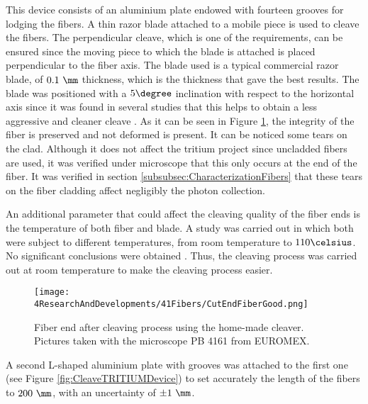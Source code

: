 This device consists of an aluminium plate endowed with fourteen grooves for lodging the fibers. A thin razor blade attached to a mobile piece is used to cleave the fibers. The perpendicular cleave, which is one of the requirements, can be ensured since the moving piece to which the blade is attached is placed perpendicular to the fiber axis. The blade used is a typical commercial razor blade, of $0.1~\mm$ thickness, which is the thickness that gave the best results. The blade was positioned with a $5\degree$ inclination with respect to the horizontal axis since it was found in several studies that this helps to obtain a less aggressive and cleaner cleave \cite{AngleBlade, TemperatureBlade}. As it can be seen in Figure \ref{fig:CleavingFiberEnd}, the integrity of the fiber is preserved and not deformed is present. It can be noticed some tears on the clad. Although it does not affect the tritium project since uncladded fibers are used, it was verified under microscope that this only occurs at the end of the fiber. It was verified in section \ref{subsubsec:CharacterizationFibers} that these tears on the fiber cladding affect negligibly the photon collection.

An additional parameter that could affect the cleaving quality of the fiber ends is the temperature of both fiber and blade. A study was carried out in which both were subject to different temperatures, from room temperature to $110\celsius$. No significant conclusions were obtained \cite{TFGAlberto}. Thus, the cleaving process was carried out at room temperature to make the cleaving process easier.

\begin{figure}[h]
\centering
\texttt{[image: 4ResearchAndDevelopments/41Fibers/CutEndFiberGood.png]}
\caption{Fiber end after cleaving process using the home-made cleaver. Pictures taken with the microscope PB 4161 from EUROMEX.\label{fig:CleavingFiberEnd}}
\end{figure}

A second L-shaped aluminium plate with grooves was attached to the first one (see Figure \ref{fig:CleaveTRITIUMDevice}) to set accurately the length of the fibers to $200~\mm$, with an uncertainty of $\pm 1~\mm$.